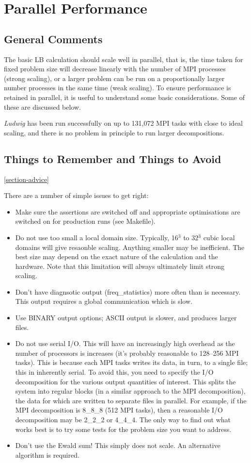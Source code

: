 \section{Parallel Performance}

\subsection{General Comments}

The basic LB calculation should scale well in parallel, that is,
the time taken for fixed problem size will decrease linearly
with the number of MPI processes (strong scaling), or a larger
problem can be run on a proportionally larger number processes
in the same time (weak scaling). To ensure performance is retained
in parallel, it is useful to understand some basic considerations.
Some of these are discussed below.

\textit{Ludwig} has been run successfully on up to 131,072 MPI
tasks with close to ideal scaling, and there is no problem in
principle to run larger decompositions.

\subsection{Things to Remember and Things to Avoid}
\ref{section-advice}

There are a number of simple issues to get right:
\begin{itemize}
\item
Make sure the assertions are switched off and appropriate optimisations
are switched on for production runs (see Makefile).
\item
Do not use too small a local domain size. Typically, 16$^3$ to 32$^3$
cubic local domains will give resaonble scaling. Anything smaller may
be inefficient. The best size may depend on the exact nature of the
calculation and the hardware. Note that this limitation will always
ultimately limit strong scaling.
\item
Don't have diagnsotic output (freq\_statistics) more often than is
necessary. This output requires a global communication which is slow.
\item
Use BINARY output options; ASCII output is slower, and produces larger
files.
\item
Do not use serial I/O. This will have an increasingly high overhead as
the number of processors is increases (it's probably reasonable to
128--256 MPI tasks). This is because each MPI tasks writes its data,
in turn, to a single file; this in inherently serial. To avoid this,
you need to specify the I/O decomposition for the various output
quantities of interest. This splits the system into regular blocks
(in a similar approach to the MPI decomposition), the data for which
are written to separate files in parallel. For example, if the MPI
decomposition is 8\_8\_8 (512 MPI tasks), then a reasonable I/O
decomposition may be 2\_2\_2 or 4\_4\_4. The only way to find out
what works best is to try some tests for the problem size you want to
address.
\item
Don't use the Ewald sum! This simply does not scale.
An alternative algorithm is required.
\end{itemize}
